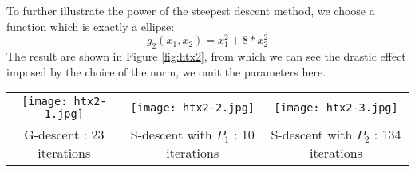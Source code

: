 \documentclass{acm_proc_article-sp}
\begin{document}
To further illustrate the power of the steepest descent method, we choose a function which is exactly a ellipse:
\begin{displaymath}
g_2(x_1, x_2) = x_1 ^ 2 + 8 * x_2 ^ 2
\end{displaymath}
The result are shown in Figure \ref{fig:htx2}, from which we can see the drastic effect imposed by the choice of the norm, we omit the parameters here.
\begin{figure*}[hp]
        \begin{tabular}{ccc}
            \texttt{[image: htx2-1.jpg]} &
            \texttt{[image: htx2-2.jpg]} &
            \texttt{[image: htx2-3.jpg]} \\
            G-descent : 23 iterations &
            S-descent with $P_1$ : 10 iterations &
            S-descent with $P_2$ : 134 iterations
        \end{tabular}
    \caption{\label{fig:htx2}Three methods for $g_2$.}
\end{figure*}
\end{document}
